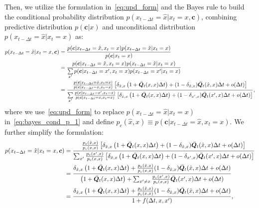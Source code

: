 Then, we utilize the formulation in~\cref{eq:upd_form} and the Bayes rule to build the conditional probability distribution $p({x}_{t- \Delta t}=\hat{x}|x_t=x, \bm{c})$, combining predictive distribution $p(\bm{c}|x)$ and unconditional distribution $p({x}_{t- \Delta t}=\hat{x}|x_t=x)$ as:
\begin{equation}
\label{eq:bayes_cond_p_1}
\begin{aligned}
 p ( x_{t-\Delta t} =\hat{x} | x_{t}=x, \bm{c} ) &=\frac{p ( \bm{c} | x_{t-\Delta t}=\hat{x}, x_{t}=x ) p ( x_{t-\Delta t}=\hat{x} | x_{t}=x )} {p ( \bm{c} | x_{t}=x )} \\
& =\frac{p ( \bm{c} | x_{t-\Delta t}=\hat{x}, x_{t}=x ) p ( x_{t-\Delta t}=\hat{x} | x_{t}=x )}{\sum\limits_{x'} p ( \bm{c} | x_{t-\Delta t}=x',x_{t}=x )p (x_{t-\Delta t}=x'|x_{t}=x )} \\
& =\frac{\frac{p ( \bm{c} | x_{t-\Delta t}=\hat{x}, x_{t}=x ) }{p ( \bm{c} | x_{t-\Delta t}={x}, x_{t}=x ) }\left[\delta_{\hat{x}, x}\left(1+\bar{{\bm{Q}}}_t(x,x)\Delta t \right) + (1-\delta_{\hat{x}, x})\bar{{\bm{Q}}}_t(\hat{x},x)\Delta t + o(\Delta t)\right] }{\sum\limits_{x'} \frac{p ( \bm{c} | x_{t-\Delta t}=x',x_{t}=x )}{p ( \bm{c} | x_{t-\Delta t}=x,x_{t}=x )}\left[\delta_{\hat{x}, x}\left(1+\bar{{\bm{Q}}}_t(x,x)\Delta t \right) + (1-\delta_{{x'}, x})\bar{{\bm{Q}}}_t({x'},x)\Delta t + o(\Delta t)\right] },
\end{aligned}
\end{equation}
where we use~\cref{eq:upd_form} to replace $p ( x_{t-\Delta t}=\hat{x} | x_{t}=x )$ in~\ref{eq:bayes_cond_p_1} and define $p_c(\hat{x},x) \equiv p(\bm{c} | x_{t-\Delta t}=\hat{x}, x_{t}=x )$. We further simplify the formulation:
\begin{equation}
\label{eq:bayes_cond_p_2}
\begin{aligned}
p ( x_{t-\Delta t} =\hat{x} | x_{t}=x, \bm{c} )  & =\frac{\frac{p_c(\hat{x},x)}{p_c(x,x)}\left[\delta_{\hat{x}, x}\left(1+\bar{{\bm{Q}}}_t(x,x)\Delta t \right) + (1-\delta_{\hat{x}, x})\bar{{\bm{Q}}}_t(\hat{x},x)\Delta t + o(\Delta t)\right] }{\sum_{x'} \frac{p_c({x'},x)}{p_c(x,x)}\left[\delta_{\hat{x}, x}\left(1+\bar{{\bm{Q}}}_t(x,x)\Delta t \right) + (1-\delta_{{x'}, x})\bar{{\bm{Q}}}_t({x'},x)\Delta t + o(\Delta t)\right] }\\
& =\frac{\delta_{\hat{x}, x}\left(1+\bar{{\bm{Q}}}_t(x,x)\Delta t \right) + \frac{p_c(\hat{x},x)}{p_c(x,x)} (1-\delta_{\hat{x}, x})\bar{{\bm{Q}}}_t(\hat{x},x)\Delta t + o(\Delta t) }{\left(1+\bar{{\bm{Q}}}_t(x,x)\Delta t \right) + \sum_{x'\neq x}\frac{p_c({x'},x)}{p_c(x,x)}\bar{{\bm{Q}}}_t({x'},x)\Delta t + o(\Delta t)}\\
& =\frac{\delta_{\hat{x}, x}\left(1+\bar{{\bm{Q}}}_t(x,x)\Delta t \right) + \frac{p_c(\hat{x},x)}{p_c(x,x)} (1-\delta_{\hat{x}, x})\bar{{\bm{Q}}}_t(\hat{x},x)\Delta t + o(\Delta t) }{1+f({\Delta t,x,x'})},
\end{aligned}
\end{equation}
